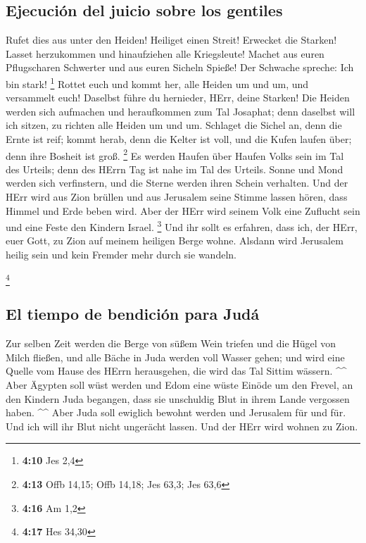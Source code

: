 \hypertarget{ejecuciuxf3n-del-juicio-sobre-los-gentiles}{%
\subsection{Ejecución del juicio sobre los
gentiles}\label{ejecuciuxf3n-del-juicio-sobre-los-gentiles}}

 Rufet dies aus unter den Heiden! Heiliget einen Streit!
Erwecket die Starken! Lasset herzukommen und hinaufziehen alle
Kriegsleute!  Machet aus euren Pflugscharen Schwerter und
aus euren Sicheln Spieße! Der Schwache spreche: Ich bin stark!
\footnote{\textbf{4:10} Jes 2,4}  Rottet euch und kommt
her, alle Heiden um und um, und versammelt euch! Daselbst führe du
hernieder, HErr, deine Starken!  Die Heiden werden sich
aufmachen und heraufkommen zum Tal Josaphat; denn daselbst will ich
sitzen, zu richten alle Heiden um und um.  Schlaget die
Sichel an, denn die Ernte ist reif; kommt herab, denn die Kelter ist
voll, und die Kufen laufen über; denn ihre Bosheit ist groß. \footnote{\textbf{4:13}
  Offb 14,15; Offb 14,18; Jes 63,3; Jes 63,6}  Es werden
Haufen über Haufen Volks sein im Tal des Urteils; denn des HErrn Tag ist
nahe im Tal des Urteils.  Sonne und Mond werden sich
verfinstern, und die Sterne werden ihren Schein verhalten.
 Und der HErr wird aus Zion brüllen und aus Jerusalem
seine Stimme lassen hören, dass Himmel und Erde beben wird. Aber der
HErr wird seinem Volk eine Zuflucht sein und eine Feste den Kindern
Israel. \footnote{\textbf{4:16} Am 1,2}  Und ihr sollt es
erfahren, dass ich, der HErr, euer Gott, zu Zion auf meinem heiligen
Berge wohne. Alsdann wird Jerusalem heilig sein und kein Fremder mehr
durch sie wandeln.

\footnote{\textbf{4:17} Hes 34,30}

\hypertarget{el-tiempo-de-bendiciuxf3n-para-juduxe1}{%
\subsection{El tiempo de bendición para
Judá}\label{el-tiempo-de-bendiciuxf3n-para-juduxe1}}

 Zur selben Zeit werden die Berge von süßem Wein triefen
und die Hügel von Milch fließen, und alle Bäche in Juda werden voll
Wasser gehen; und wird eine Quelle vom Hause des HErrn herausgehen, die
wird das Tal Sittim wässern. \^{}\^{}  Aber Ägypten soll
wüst werden und Edom eine wüste Einöde um den Frevel, an den Kindern
Juda begangen, dass sie unschuldig Blut in ihrem Lande vergossen haben.
\^{}\^{}  Aber Juda soll ewiglich bewohnt werden und
Jerusalem für und für.  Und ich will ihr Blut nicht
ungerächt lassen. Und der HErr wird wohnen zu Zion.
